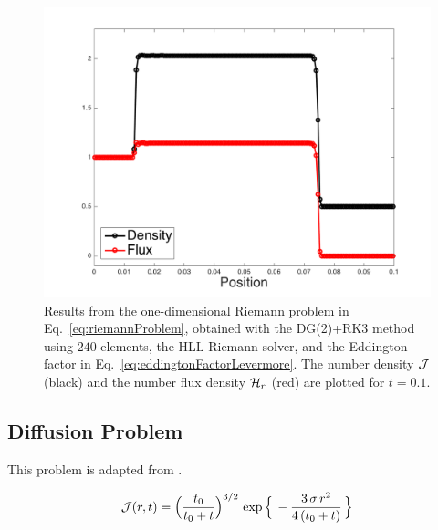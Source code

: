 \documentclass[10pt,preprint]{aastex}
\begin{document}
\begin{figure}
  \begin{center}
    \includegraphics[scale=0.5]{./Figures/RiemannProblem1D}
  \end{center}
  \caption{Results from the one-dimensional Riemann problem in Eq.~\eqref{eq:riemannProblem}, obtained with the DG(2)+RK3 method using $240$ elements, the HLL Riemann solver, and the Eddington factor in Eq.~\eqref{eq:eddingtonFactorLevermore}.  
  The number density $\mathcal{J}$ (black) and the number flux density $\mathcal{H}_{r}$ (red) are plotted for $t=0.1$.}
  \label{fig:riemannProblem}
\end{figure}

\subsection{Diffusion Problem}

This problem is adapted from \citet{abdikamalov_etal_2012} \citep[see also][]{pons_etal_2000,sumiyoshiYamada_2012}.  

\begin{equation}
  \mathcal{J}(r,t)=\Big(\frac{t_{0}}{t_{0}+t}\Big)^{3/2}\,\exp\Big\{\,-\frac{3\,\sigma\,r^{2}}{4\,(t_{0}+t)}\,\Big\}
\end{equation}
\end{document}
